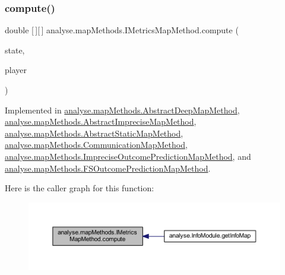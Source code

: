 \subsubsection{\texorpdfstring{compute()}{compute()}}
{\footnotesize\ttfamily double \mbox{[}$\,$\mbox{]}\mbox{[}$\,$\mbox{]} analyse.\+map\+Methods.\+I\+Metrics\+Map\+Method.\+compute (\begin{DoxyParamCaption}\item[{\mbox{\hyperlink{classgame_1_1game_state_1_1_game_state}{Game\+State}}}]{state,  }\item[{\mbox{\hyperlink{enumgame_1_1_e_player}{E\+Player}}}]{player }\end{DoxyParamCaption})}



Implemented in \mbox{\hyperlink{classanalyse_1_1map_methods_1_1_abstract_deep_map_method_a02252e0eb987838131c5586ab775b849}{analyse.\+map\+Methods.\+Abstract\+Deep\+Map\+Method}}, \mbox{\hyperlink{classanalyse_1_1map_methods_1_1_abstract_imprecise_map_method_a05c258bdd82babbaad63b4a9a5bbb063}{analyse.\+map\+Methods.\+Abstract\+Imprecise\+Map\+Method}}, \mbox{\hyperlink{classanalyse_1_1map_methods_1_1_abstract_static_map_method_a314b86189e095a68a77027e051f0ea9c}{analyse.\+map\+Methods.\+Abstract\+Static\+Map\+Method}}, \mbox{\hyperlink{classanalyse_1_1map_methods_1_1_communication_map_method_a9e617c1890ad709390adc27497bfd6ea}{analyse.\+map\+Methods.\+Communication\+Map\+Method}}, \mbox{\hyperlink{classanalyse_1_1map_methods_1_1_imprecise_outcome_prediction_map_method_ac10aaad7dc1b63b9cb518b93c5d2b1a3}{analyse.\+map\+Methods.\+Imprecise\+Outcome\+Prediction\+Map\+Method}}, and \mbox{\hyperlink{classanalyse_1_1map_methods_1_1_f_s_outcome_prediction_map_method_af2f0988760eea49a665a0eeb3db9b591}{analyse.\+map\+Methods.\+F\+S\+Outcome\+Prediction\+Map\+Method}}.

Here is the caller graph for this function\+:
\nopagebreak
\begin{figure}[H]
\begin{center}
\leavevmode
\includegraphics[width=350pt]{interfaceanalyse_1_1map_methods_1_1_i_metrics_map_method_aef15b826032a8cc1140563d539dd1319_icgraph}
\end{center}
\end{figure}
\mbox{\label{interfaceanalyse_1_1map_methods_1_1_i_metrics_map_method_a102909023c32cebe3bc75052f55b24a0}} 
